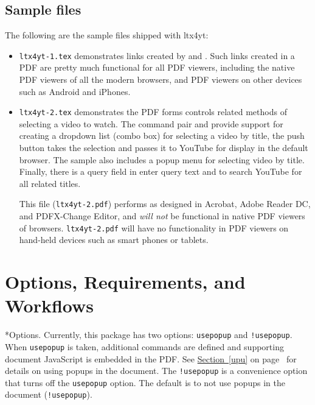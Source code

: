 \documentclass{article}
\makeatletter
\let\app\textsf
\let\opt\texttt
\renewcommand*{\theparagraph}{\texorpdfstring{\protect\P\protect\ }{\textparagraph}}
\renewcommand{\paragraph}
    {\renewcommand{\@seccntformat}[1]{\theparagraph}%
    \@startsection{paragraph}{4}{0pt}{6pt}{-3pt}{\bfseries}} %
\def\FmtMP#1{\marginpar{\slshape\raggedleft\small#1}}
\newcommand{\YT}{\textsf{YouTube}}
\makeatother
\begin{document}

\subsection{Sample files}

The following are the sample files shipped with \textsf{ltx4yt}:
\begin{itemize}
    \item \texttt{ltx4yt-1.tex} demonstrates links created by 
        and . Such links created in a PDF are pretty much
        functional for all PDF viewers, including the native PDF viewers of
        all the modern browsers, and PDF viewers on other devices such as
        \app{Android} and \app{iPhones}.

    \item \texttt{ltx4yt-2.tex} demonstrates the PDF forms controls related
        methods of selecting a video to watch. The command pair
         and  provide support for creating a
        dropdown list (combo box) for selecting a video by title, the push
        button takes the selection and passes it to {\YT} for display
        in the default browser. The sample also includes a popup menu for
        selecting video by title. Finally, there is a query field in enter
        query text and to search {\YT} for all related titles.

        This file (\texttt{ltx4yt-2.pdf}) performs as designed in
        \app{Acrobat}, \app{Adobe Reader DC}, and \app{PDFX-Change Editor},
        and \emph{will not} be functional in native PDF viewers of
        browsers. \texttt{ltx4yt-2.pdf} will have no functionality in PDF
        viewers on hand-held devices such as smart phones or tablets.
\end{itemize}

\section{Options, Requirements, and Workflows}

\paragraph*{Options.} Currently, this package has two options: \opt{usepopup}\FmtMP{\opt{usepopup}
option} and \opt{!usepopup}. When \opt{usepopup} is taken, additional
commands are defined and supporting document Java\-Script is embedded in the
PDF. See \hyperref[upu]{Section~\ref*{upu}} on page~\pageref*{upu} for details on using popups in the document. The
\opt{!usepopup} is a convenience option that turns off the \opt{usepopup}
option. The default is to not use popups in the document (\opt{!usepopup}).
\end{document}

